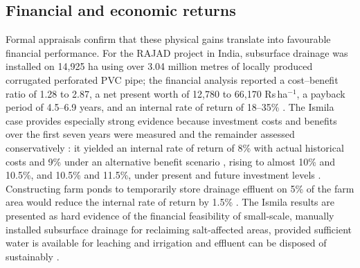 \subsection{Financial and economic returns}
Formal appraisals confirm that these physical gains translate into favourable financial performance. For the RAJAD project in India, subsurface drainage was installed on 14{,}925 ha using over 3.04 million metres of locally produced corrugated perforated PVC pipe; the financial analysis reported a cost--benefit ratio of 1.28 to 2.87, a net present worth of 12{,}780 to 66{,}170 Rs\,ha$^{-1}$, a payback period of 4.5--6.9 years, and an internal rate of return of 18--35\% \parencite{Gopalakrishnan2007}. The Ismila case provides especially strong evidence because investment costs and benefits over the first seven years were measured and the remainder assessed conservatively \parencite{Datta2000}: it yielded an internal rate of return of 8\% with actual historical costs and 9\% under an alternative benefit scenario \parencite{Datta2000,Datta2002}, rising to almost 10\% and 10.5\%, and 10.5\% and 11.5\%, under present and future investment levels \parencite{Datta2000}. Constructing farm ponds to temporarily store drainage effluent on 5\% of the farm area would reduce the internal rate of return by 1.5\% \parencite{Datta2000}. The Ismila results are presented as hard evidence of the financial feasibility of small-scale, manually installed subsurface drainage for reclaiming salt-affected areas, provided sufficient water is available for leaching and irrigation and effluent can be disposed of sustainably \parencite{Datta2000}.

